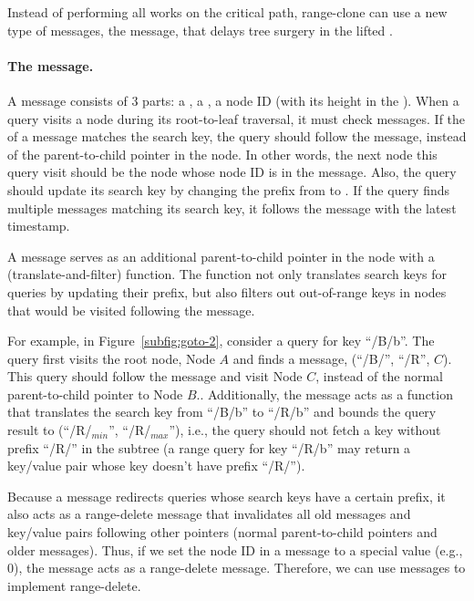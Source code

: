 Instead of performing all works on the critical path, range-clone can use a
new type of messages, the \goto message, that delays tree surgery
in the lifted \bedag.

\paragraph{The \goto message.}
A \goto message consists of 3 parts: a \dpre, a \spre, a node ID
(with its height in the \bedag).
When a query visits a node during its root-to-leaf traversal, it must check
\goto messages.
If the \dpre of a \goto message matches the search key, the query should follow
the \goto message, instead of the parent-to-child pointer in the node.
In other words, the next node this query visit should be the node whose node ID
is in the \goto message.
Also, the query should update its search key by changing the prefix from \dpre
to \spre.
If the query finds multiple \goto messages matching its search key, it follows
the \goto message with the latest timestamp.

A \goto message serves as an additional parent-to-child pointer in the node with
a \xf (translate-and-filter) function.
The \xf function not only translates search keys for queries by updating their
prefix, but also filters out out-of-range keys in nodes that would be visited
following the \goto message.

For example, in Figure~\ref{subfig:goto-2}, consider a query for key ``/B/b''.
The query first visits the root node, Node $A$ and finds a \goto message,
\goto(``/B/'', ``/R'', $C$).
This query should follow the \goto message and visit Node $C$,
instead of the normal parent-to-child pointer to Node $B$..
Additionally, the \goto message acts as a \xf function that translates the
search key from ``/B/b'' to ``/R/b'' and bounds the query result to
(``/R/$_{min}$'', ``/R/$_{max}$''),
i.e., the query should not fetch a key without prefix ``/R/'' in the subtree
(a range query for key ``/R/b'' may return a key/value pair whose key doesn't
have prefix ``/R/'').

Because a \goto message redirects queries whose search keys have a certain
prefix, it also acts as a range-delete message that invalidates all old messages
and key/value pairs following other pointers (normal parent-to-child pointers
and older \goto messages).
Thus, if we set the node ID in a \goto message to a special value
(e.g., 0), the \goto message acts as a range-delete message.
Therefore, we can use \goto messages to implement range-delete.

